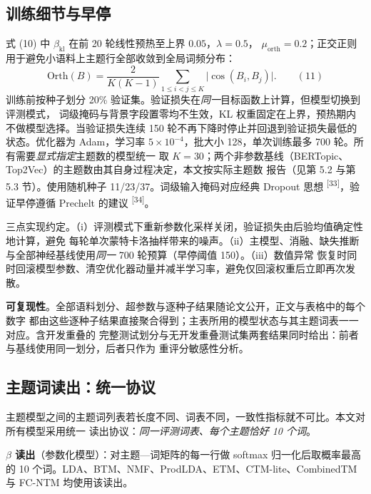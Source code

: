\documentclass{article}
\begin{document}
\subsection{训练细节与早停}

式 (10) 中 $\beta_{\mathrm{kl}}$ 在前 20 轮线性预热至上界 $0.05$，$\lambda=0.5$，
$\mu_{\mathrm{orth}}=0.2$；正交正则用于避免小语料上主题行全部收敛到全局词频分布：
\begin{equation}
\mathrm{Orth}(B)=\frac{2}{K(K-1)}\sum_{1\le i<j\le K}\big|\cos(B_i,B_j)\big| .
\qquad(11)\end{equation}
训练前按种子划分 20\% 验证集。验证损失在\emph{同一}目标函数上计算，但模型切换到评测模式，
词级掩码与背景字段置零均不生效，KL 权重固定在上界，预热期内不做模型选择。当验证损失连续
150 轮不再下降时停止并回退到验证损失最低的状态。优化器为 Adam，学习率
$5\times10^{-4}$，批大小 128，单次训练最多 700 轮。所有需要\emph{显式指定}主题数的模型统一
取 $K=30$；两个非参数基线（BERTopic、Top2Vec）的主题数由其自身过程决定，本文按实际主题数
报告（见第 5.2 与第 5.3 节）。使用随机种子
11/23/37。词级输入掩码对应经典 Dropout 思想 \textsuperscript{[33]}，验证早停遵循
Prechelt 的建议 \textsuperscript{[34]}。

三点实现约定。（i）评测模式下重新参数化采样关闭，验证损失由后验均值确定性地计算，避免
每轮单次蒙特卡洛抽样带来的噪声。（ii）主模型、消融、缺失推断与全部神经基线使用\emph{同一}
700 轮预算（早停阈值 150）。（iii）数值异常
恢复时同时回滚模型参数、清空优化器动量并减半学习率，避免仅回滚权重后立即再次发散。

\textbf{可复现性}。全部语料划分、超参数与逐种子结果随论文公开，正文与表格中的每个数字
都由这些逐种子结果直接聚合得到；主表所用的模型状态与其主题词表一一对应。含开发重叠的
完整测试划分与无开发重叠测试集两套结果同时给出：前者与基线使用同一划分，后者只作为
重评分敏感性分析。

\subsection{主题词读出：统一协议}

主题模型之间的主题词列表若长度不同、词表不同，一致性指标就不可比。本文对所有模型采用统一
读出协议：\emph{同一评测词表、每个主题恰好 10 个词}。

\textbf{$\beta$ 读出}（参数化模型）：对主题—词矩阵的每一行做 softmax 归一化后取概率最高的
10 个词。LDA、BTM、NMF、ProdLDA、ETM、CTM-lite、CombinedTM 与 FC-NTM 均使用该读出。
\end{document}

